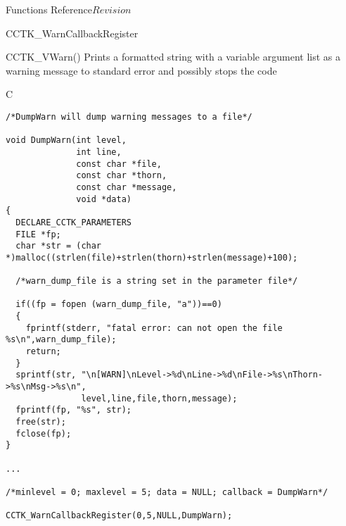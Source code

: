 \begin{cactuspart}{ Functions Reference}{}{$Revision$}
\begin{FunctionDescription}{CCTK\_WarnCallbackRegister}
\begin{SeeAlsoSection}
\begin{SeeAlso}{CCTK\_VWarn()}
Prints a formatted string with a variable argument list as a warning message
to standard error and possibly stops the code
\end{SeeAlso}

\end{SeeAlsoSection}

\begin{ExampleSection}
\begin{Example}{C}
\begin{verbatim}
/*DumpWarn will dump warning messages to a file*/

void DumpWarn(int level,
              int line,
              const char *file,
              const char *thorn,
              const char *message,
              void *data)
{
  DECLARE_CCTK_PARAMETERS
  FILE *fp;
  char *str = (char *)malloc((strlen(file)+strlen(thorn)+strlen(message)+100);

  /*warn_dump_file is a string set in the parameter file*/

  if((fp = fopen (warn_dump_file, "a"))==0)
  {
    fprintf(stderr, "fatal error: can not open the file %s\n",warn_dump_file);
    return;
  }
  sprintf(str, "\n[WARN]\nLevel->%d\nLine->%d\nFile->%s\nThorn->%s\nMsg->%s\n",
               level,line,file,thorn,message);
  fprintf(fp, "%s", str);
  free(str);
  fclose(fp);
}

...

/*minlevel = 0; maxlevel = 5; data = NULL; callback = DumpWarn*/

CCTK_WarnCallbackRegister(0,5,NULL,DumpWarn);
\end{verbatim}
\end{Example}
\end{ExampleSection}
\end{FunctionDescription}


\end{cactuspart}
